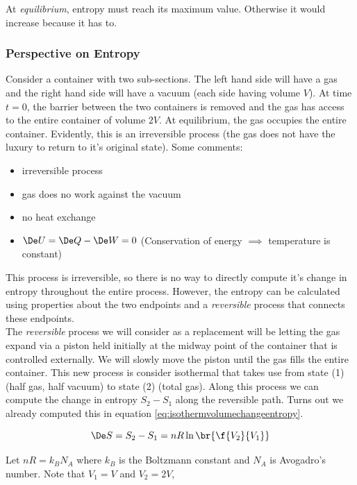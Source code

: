\documentclass{article}
\begin{document}
At \textit{equilibrium}, entropy must reach its maximum value. Otherwise it would increase because it has to.

\subsubsection{Perspective on Entropy}

Consider a container with two sub-sections. The left hand side will have a gas and the right hand side will have a vacuum (each side having volume $V$). At time $t=0$, the barrier between the two containers is removed and the gas has access to the entire container of volume $2V$. At equilibrium, the gas occupies the entire container. Evidently, this is an irreversible process (the gas does not have the luxury to return to it's original state). Some comments:

\begin{itemize}
    \item irreversible process
    \item gas does no work against the vacuum
    \item no heat exchange
    \item $\De U = \De Q - \De W = 0$ (Conservation of energy $\implies$ temperature is constant)
\end{itemize}

This process is irreversible, so there is no way to directly compute it's change in entropy throughout the entire process. However, the entropy can be calculated using properties about the two endpoints and a \textit{reversible} process that connects these endpoints. \\

The \textit{reversible} process we will consider as a replacement will be letting the gas expand via a piston held initially at the midway point of the container that is controlled externally. We will slowly move the piston until the gas fills the entire container. This new process is consider isothermal that takes use from state (1) (half gas, half vacuum) to state (2) (total gas). Along this process we can compute the change in entropy $S_2 - S_1$ along the reversible path. Turns out we already computed this in equation \eqref{eq:isothermvolumechangeentropy}.

\[ \De S = S_2 - S_1 = nR \ln\br{\f{V_2}{V_1}} \]

Let $nR = k_BN_A$ where $k_B$ is the Boltzmann constant and $N_A$ is Avogadro's number. Note that $V_1 = V$ and $V_2 = 2V$,
\end{document}
